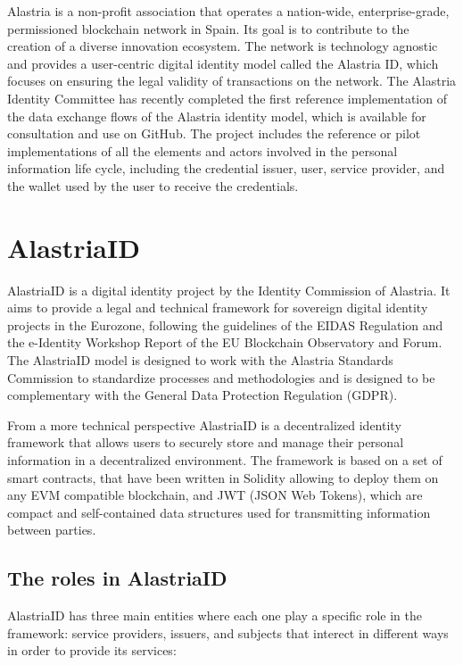 \documentclass[target=mst,aauheader=]{thud}
\begin{document}
Alastria is a non-profit association that operates a nation-wide, enterprise-grade, permissioned blockchain network in Spain. Its goal is to contribute to the creation of a diverse innovation ecosystem. The network is technology agnostic and provides a user-centric digital identity model called the Alastria ID, which focuses on ensuring the legal validity of transactions on the network. The Alastria Identity Committee has recently completed the first reference implementation of the data exchange flows of the Alastria identity model, which is available for consultation and use on GitHub. The project includes the reference or pilot implementations of all the elements and actors involved in the personal information life cycle, including the credential issuer, user, service provider, and the wallet used by the user to receive the credentials.

\section{AlastriaID}

AlastriaID is a digital identity project by the Identity Commission of Alastria. It aims to provide a legal and technical framework for sovereign digital identity projects in the Eurozone, following the guidelines of the EIDAS Regulation and the e-Identity Workshop Report of the EU Blockchain Observatory and Forum. The AlastriaID model is designed to work with the Alastria Standards Commission to standardize processes and methodologies and is designed to be complementary with the General Data Protection Regulation (GDPR).

From a more technical perspective AlastriaID is a decentralized identity framework that allows users to securely store and manage their personal information in a decentralized environment. The framework is based on a set of smart contracts, that have been written in Solidity allowing to deploy them on any EVM compatible blockchain, and JWT (JSON Web Tokens), which are compact and self-contained data structures used for transmitting information between parties. 

\subsection{The roles in AlastriaID}

AlastriaID has three main entities where each one play a specific role in the framework: service providers, issuers, and subjects that interect in different ways in order to provide its services:
\end{document}
